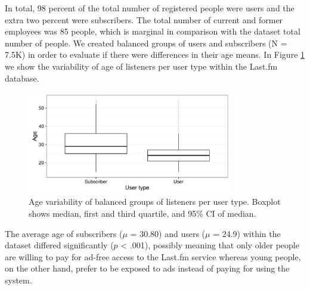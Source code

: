 In total, 98 percent of the total number of registered people were users and the extra two percent were subscribers. The total number of current and former employees was 85 people, which is marginal in comparison with the dataset total number of people.
We created balanced groups of users and subscribers (N = 7.5K) in order to evaluate if there were differences in their age means.
In Figure \ref{fig:user_type_versus_age} we show the variability of age of listeners per user type within the Last.fm database.

\begin{figure}[!h]
	\centering
	\includegraphics[width=0.80\textwidth]{user_type_versus_age.pdf}				
	\caption[Age variability of balanced groups of listeners per user type]{Age variability of balanced groups of listeners per user type. Boxplot shows median, first and third quartile, and 95\% CI of median.}
	\label{fig:user_type_versus_age}
\end{figure}


The average age of subscribers ($\mu$ = 30.80) and users ($\mu$ = 24.9) within the dataset differed significantly ($p$ < .001), possibly meaning that only older people are willing to pay for ad-free access to the Last.fm service whereas young people, on the other hand, prefer to be exposed to ads instead of paying for using the system.









